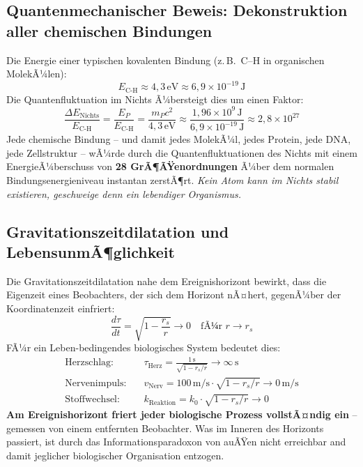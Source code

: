 ﻿\documentclass[12pt,a4paper]{report}
\begin{document}
\subsection{Quantenmechanischer Beweis: Dekonstruktion aller chemischen Bindungen}

Die Energie einer typischen kovalenten Bindung (z.\,B.\ C--H in organischen MolekÃ¼len):
\begin{equation}
    E_{\text{C-H}} \approx 4{,}3\,\text{eV} \approx 6{,}9 \times 10^{-19}\,\text{J}
    \label{eq:kovalente_bindung}
\end{equation}
Die Quantenfluktuation im Nichts Ã¼bersteigt dies um einen Faktor:
\begin{equation}
    \frac{\Delta E_{\text{Nichts}}}{E_{\text{C-H}}} = \frac{E_P}{E_{\text{C-H}}} = \frac{m_P c^2}{4{,}3\,\text{eV}} \approx \frac{1{,}96 \times 10^9\,\text{J}}{6{,}9 \times 10^{-19}\,\text{J}} \approx 2{,}8 \times 10^{27}
    \label{eq:ueberlebensfaktor}
\end{equation}
Jede chemische Bindung -- und damit jedes MolekÃ¼l, jedes Protein, jede DNA, jede Zellstruktur -- wÃ¼rde durch die Quantenfluktuationen des Nichts mit einem EnergieÃ¼berschuss von \textbf{28 GrÃ¶ÃŸenordnungen} Ã¼ber dem normalen Bindungsenergieniveau instantan zerstÃ¶rt. \emph{Kein Atom kann im Nichts stabil existieren, geschweige denn ein lebendiger Organismus.}

\subsection{Gravitationszeitdilatation und LebensunmÃ¶glichkeit}

Die Gravitationszeitdilatation nahe dem Ereignishorizont bewirkt, dass die Eigenzeit eines Beobachters, der sich dem Horizont nÃ¤hert, gegenÃ¼ber der Koordinatenzeit einfriert:
\begin{equation}
    \frac{d\tau}{dt} = \sqrt{1 - \frac{r_s}{r}} \longrightarrow 0 \quad \text{fÃ¼r } r \to r_s
    \label{eq:zeitdilatation_horizont}
\end{equation}
FÃ¼r ein Leben-bedingendes biologisches System bedeutet dies:
\begin{align}
    \text{Herzschlag:} & \quad \tau_{\text{Herz}} = \frac{1\,\text{s}}{\sqrt{1-r_s/r}} \to \infty\,\text{s}\\
    \text{Nervenimpuls:} & \quad v_{\text{Nerv}} = 100\,\text{m/s} \cdot \sqrt{1-r_s/r} \to 0\,\text{m/s}\\
    \text{Stoffwechsel:} & \quad k_{\text{Reaktion}} = k_0 \cdot \sqrt{1 - r_s/r} \to 0
\end{align}
\textbf{Am Ereignishorizont friert jeder biologische Prozess vollstÃ¤ndig ein} -- gemessen von einem entfernten Beobachter. Was im Inneren des Horizonts passiert, ist durch das Informationsparadoxon von auÃŸen nicht erreichbar and damit jeglicher biologischer Organisation entzogen.
\end{document}
